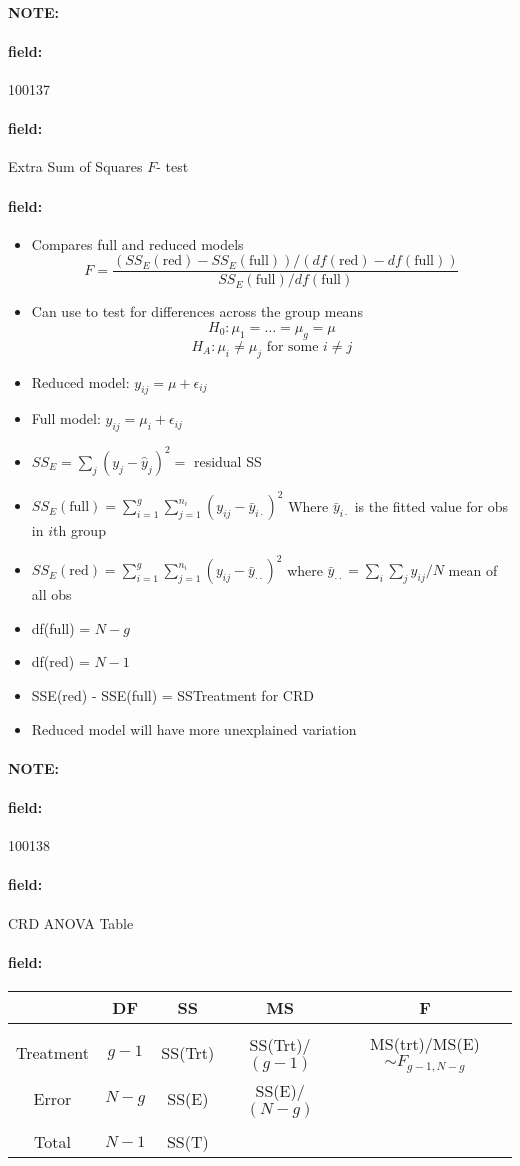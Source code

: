 \documentclass[12pt]{article}
\newenvironment{note}{\paragraph{NOTE:}}{}
\newenvironment{field}{\paragraph{field:}}{}
\begin{document}
\begin{note}
 \begin{field}
  \tiny 100137
 \end{field}
 \begin{field}
  Extra Sum of Squares $F$- test
 \end{field}
 \begin{field}
  \begin{itemize}
   \item Compares full and reduced models
         $$ F = \frac{(SS_E(\text{red}) - SS_E(\text{full}))/(df(\text{red}) - df(\text{full}))}{SS_E(\text{full})/df(\text{full})}$$
   \item Can use to test for differences across the group means
         $$ H_0: \mu_1 = \ldots = \mu_g = \mu$$
         $$H_A: \mu_i \neq \mu_j  \text{ for some } i \neq j$$
   \item Reduced model: $y_{ij} = \mu + \epsilon_{ij}$
   \item Full model: $y_{ij} = \mu_i + \epsilon_{ij}$
   \item $SS_E = \sum_{j}(y_j - \hat{y}_j)^2 = $ residual SS
   \item $SS_E(\text{full}) = \sum_{i = 1}^g \sum_{j = 1}^{n_i}(y_{ij} - \bar{y}_{i\cdot})^2$ Where $\bar{y}_{i\cdot}$ is the fitted value for obs in $i$th group
   \item $SS_E(\text{red}) = \sum_{i=1}^g \sum_{j=1}^{n_i}(y_{ij} - \bar{y}_{\cdot \cdot})^2$ where $\bar{y}_{\cdot\cdot} = \sum_{i}\sum_j y_{ij}/N$ mean of all obs
   \item df(full) = $N-g$
   \item df(red) = $N-1$
   \item SSE(red) - SSE(full) = SSTreatment for CRD
   \item Reduced model will have more unexplained variation
  \end{itemize}
 \end{field}
\end{note}

\begin{note}
 \begin{field}
  \tiny 100138
 \end{field}
 \begin{field}
  CRD ANOVA Table
 \end{field}
 \begin{field}
  \begin{tabular}{c|c c c c}
             & DF    & SS      & MS              & F                                \\
   \hline                                                                           \\
   Treatment & $g-1$ & SS(Trt) & SS(Trt)/$(g-1)$ & MS(trt)/MS(E) $\sim F_{g-1,N-g}$ \\
   Error     & $N-g$ & SS(E)   & SS(E)/$(N-g)$   &                                  \\
   \hline                                                                           \\
   Total     & $N-1$ & SS(T)   &                 &
  \end{tabular}
 \end{field}
\end{note}
\end{document}
